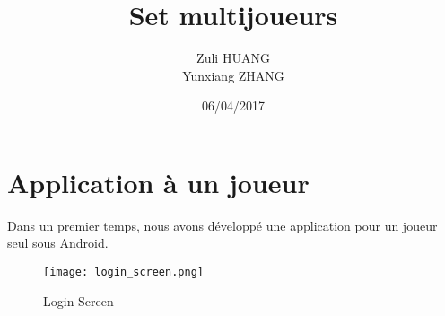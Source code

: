 \documentclass[titlepage,11pt,a4paper]{article}
\title[INF 431 Programming Project]{Set multijoueurs}
\author{Zuli \textsc{HUANG}\\
            Yunxiang \textsc{ZHANG}
            }
\date{06/04/2017}
\begin{document}
\maketitle

\section{Application à un joueur}
Dans un premier temps, nous avons développé une application pour un joueur seul sous Android.

\begin{figure}[h]
    \centering
    \texttt{[image: login\_screen.png]}
    \caption{Login Screen}
    \label{fig:questioin_1.2_out}
\end{figure}
\end{document}
